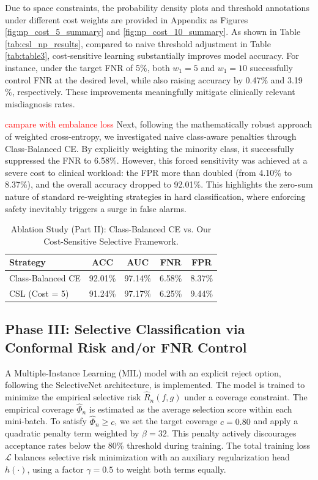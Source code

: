 \documentclass[sigconf,review,anonymous]{acmart}
\theoremstyle{remark}
\begin{document}
Due to space constraints, the probability density plots and threshold annotations under different cost weights are provided in Appendix as Figures \ref{fig:np_cost_5_summary} and \ref{fig:np_cost_10_summary}. As shown in Table \ref{tab:csl_np_results}, compared to naive threshold adjustment in Table \ref{tab:table3}, cost‑sensitive learning substantially improves model accuracy. For instance, under the target FNR of 5\%, both $w_{1}=5$ and $w_{1}=10$ successfully control FNR at the desired level, while also raising accuracy by 0.47\% and 3.19 \%, respectively. These improvements meaningfully mitigate clinically relevant misdiagnosis rates.

\textcolor{red}{campare with embalance loss}
Next, following the mathematically robust approach of weighted cross-entropy, we investigated naive class-aware penalties through Class-Balanced CE. By explicitly weighting the minority class, it successfully suppressed the FNR to 6.58\%. However, this forced sensitivity was achieved at a severe cost to clinical workload: the FPR more than doubled (from 4.10\% to 8.37\%), and the overall accuracy dropped to 92.01\%. This highlights the zero-sum nature of standard re-weighting strategies in hard classification, where enforcing safety inevitably triggers a surge in false alarms.

\begin{table}[htbp]
  \centering
  \caption{Ablation Study (Part II): Class-Balanced CE vs. Our Cost-Sensitive Selective Framework.}
  \label{tab:loss_cost_sensitive}
  \begin{tabular}{lcccc}
    \toprule
    \textbf{Strategy} & ACC & AUC & FNR  & FPR \\
    \midrule
    Class-Balanced CE & 92.01\% & 97.14\% & 6.58\% & 8.37\% \\
    CSL (Cost = 5)    & 91.24\% & 97.17\% & 6.25\% & 9.44\% \\
    \bottomrule
  \end{tabular}
\end{table}


\subsection{Phase III: Selective Classification via Conformal Risk and/or FNR Control } \label{sec:phase3_results}

A Multiple-Instance Learning (MIL) model with an explicit reject option, following the SelectiveNet architecture, is implemented. The model is trained to minimize the empirical selective risk $\hat{R}_n(f,g)$ under a coverage constraint. The empirical coverage $\hat{\Phi}_n$ is estimated as the average selection score within each mini-batch. To satisfy $\hat{\Phi}_n \ge c$, we set the target coverage $c = 0.80$ and apply a quadratic penalty term weighted by $\beta = 32$. This penalty actively discourages acceptance rates below the 80\% threshold during training. The total training loss $\mathcal{L}$ balances selective risk minimization with an auxiliary regularization head $h(\cdot)$, using a factor $\gamma = 0.5$ to weight both terms equally.
 
\end{document}
